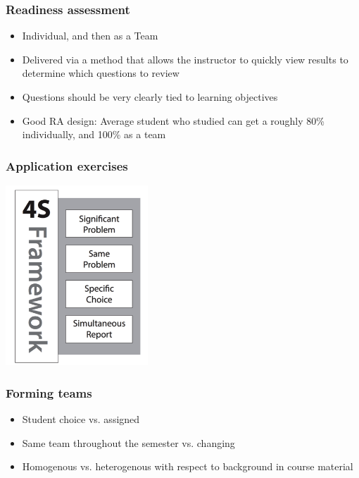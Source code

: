 \documentclass{beamer}
\begin{document}
\begin{frame}
\frametitle{Readiness assessment}

\begin{itemize}

\item Individual, and then as a Team

\item Delivered via a method that allows the instructor to quickly view results to determine which questions to review

\item Questions should be very clearly tied to learning objectives

\item Good RA design: Average student who studied can get a roughly 80\% individually, and 100\% as a team

\end{itemize}

\end{frame}


\begin{frame}
\frametitle{Application exercises}

\begin{center}
\includegraphics[width = 0.4\textwidth]{figures/4s}
\end{center}

\end{frame}


\begin{frame}
\frametitle{Forming teams}

\begin{itemize}

\item Student choice vs. assigned

\item Same team throughout the semester vs. changing

\item Homogenous vs. heterogenous with respect to background in course material

\end{itemize}

\end{frame}
\end{document}
